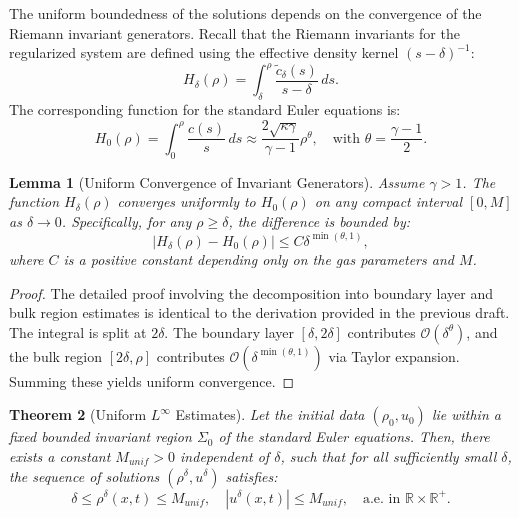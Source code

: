 \documentclass[12pt, reqno]{article}
\newtheorem{theorem}{Theorem}[section]
\newtheorem{lemma}[theorem]{Lemma}
\theoremstyle{definition}
\numberwithin{equation}{section}
\begin{document}
The uniform boundedness of the solutions depends on the convergence of the Riemann invariant generators. Recall that the Riemann invariants for the regularized system are defined using the effective density kernel $(s-\delta)^{-1}$:
\begin{equation}
    H_\delta(\rho) = \int_{\delta}^{\rho} \frac{\tilde{c}_\delta(s)}{s-\delta} \, ds.
\end{equation}
The corresponding function for the standard Euler equations is:
\begin{equation}
    H_0(\rho) = \int_{0}^{\rho} \frac{c(s)}{s} \, ds \approx \frac{2\sqrt{\kappa\gamma}}{\gamma-1}\rho^{\theta}, \quad \text{with } \theta = \frac{\gamma-1}{2}.
\end{equation}

\begin{lemma}[Uniform Convergence of Invariant Generators]
\label{lem:H_convergence}
Assume $\gamma > 1$. The function $H_\delta(\rho)$ converges uniformly to $H_0(\rho)$ on any compact interval $[0, M]$ as $\delta \to 0$. Specifically, for any $\rho \ge \delta$, the difference is bounded by:
\begin{equation}
    |H_\delta(\rho) - H_0(\rho)| \le C \delta^{\min(\theta, 1)},
\end{equation}
where $C$ is a positive constant depending only on the gas parameters and $M$.
\end{lemma}

\begin{proof}
The detailed proof involving the decomposition into boundary layer and bulk region estimates is identical to the derivation provided in the previous draft. The integral is split at $2\delta$. The boundary layer $[\delta, 2\delta]$ contributes $\mathcal{O}(\delta^\theta)$, and the bulk region $[2\delta, \rho]$ contributes $\mathcal{O}(\delta^{\min(\theta, 1)})$ via Taylor expansion. Summing these yields uniform convergence.
\end{proof}

\begin{theorem}[Uniform $L^\infty$ Estimates]
\label{thm:uniform_estimates_delta}
Let the initial data $(\rho_0, u_0)$ lie within a fixed bounded invariant region $\Sigma_0$ of the standard Euler equations. Then, there exists a constant $M_{unif} > 0$ independent of $\delta$, such that for all sufficiently small $\delta$, the sequence of solutions $(\rho^{\delta}, u^{\delta})$ satisfies:
\begin{equation}
    \delta \le \rho^{\delta}(x,t) \le M_{unif}, \quad |u^{\delta}(x,t)| \le M_{unif}, \quad \text{a.e. in } \mathbb{R} \times \mathbb{R}^+.
\end{equation}
\end{theorem}
\end{document}
